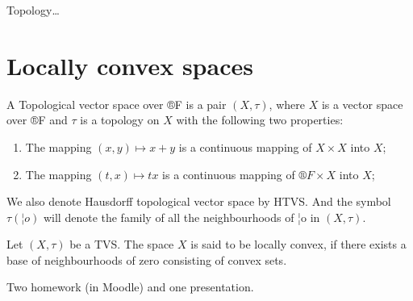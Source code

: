 \documentclass[12pt]{article}					%
\begin{document}

\begin{poznamka}
	Topology…
\end{poznamka}

\vspace{-2em}

\section{Locally convex spaces}

\begin{definice}
	A Topological vector space over ®F is a pair $(X, τ)$, where $X$ is a vector space over ®F and $τ$ is a topology on $X$ with the following two properties:
	\begin{enumerate}
		\item The mapping $(x, y) \mapsto x + y$ is a continuous mapping of $X \times X$ into $X$;
		\item The mapping $(t, x) \mapsto tx$ is a continuous mapping of $®F \times X$ into $X$;
	\end{enumerate}

	We also denote Hausdorff topological vector space by HTVS. And the symbol $τ(¦o)$ will denote the family of all the neighbourhoods of ¦o in $(X, τ)$.
\end{definice}

\begin{definice}
	Let $(X, τ)$ be a TVS. The space $X$ is said to be locally convex, if there exists a base of neighbourhoods of zero consisting of convex sets.
\end{definice}

\begin{poznamka}[Credit]
	Two homework (in Moodle) and one presentation.
\end{poznamka}
\end{document}
